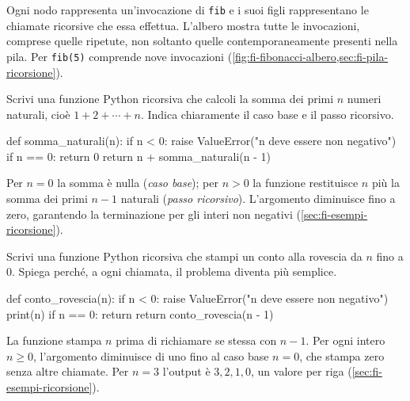 Ogni nodo rappresenta un'invocazione di \texttt{fib} e i suoi
figli rappresentano le chiamate ricorsive che essa effettua.
L'albero mostra tutte le invocazioni, comprese quelle ripetute,
non soltanto quelle contemporaneamente presenti nella pila.
Per \texttt{fib(5)} comprende nove invocazioni
(\cref{fig:fi-fibonacci-albero,sec:fi-pila-ricorsione}).

\begin{exercise}
\label{ex:fi-esercizi-ricorsione-somma-naturali}
Scrivi una funzione Python ricorsiva che calcoli la somma dei primi
\(n\) numeri naturali, cioè \(1+2+\cdots+n\). Indica chiaramente
il caso base e il passo ricorsivo.
\end{exercise}

\begin{unipdcode}[language=Python]
def somma_naturali(n):
    if n < 0:
        raise ValueError("n deve essere non negativo")
    if n == 0:
        return 0
    return n + somma_naturali(n - 1)
\end{unipdcode}

Per \(n=0\) la somma è nulla (\emph{caso base}); per \(n>0\)
la funzione restituisce \(n\) più la somma dei primi \(n-1\)
naturali (\emph{passo ricorsivo}). L'argomento diminuisce fino a
zero, garantendo la terminazione per gli interi non negativi
(\cref{sec:fi-esempi-ricorsione}).

\begin{exercise}
\label{ex:fi-esercizi-ricorsione-conto-rovescia}
Scrivi una funzione Python ricorsiva che stampi un conto alla
rovescia da \(n\) fino a \(0\). Spiega perché, a ogni chiamata,
il problema diventa più semplice.
\end{exercise}

\begin{unipdcode}[language=Python]
def conto_rovescia(n):
    if n < 0:
        raise ValueError("n deve essere non negativo")
    print(n)
    if n == 0:
        return
    return conto_rovescia(n - 1)
\end{unipdcode}

La funzione stampa \(n\) prima di richiamare se stessa con
\(n-1\). Per ogni intero \(n\ge0\), l'argomento diminuisce di
uno fino al caso base \(n=0\), che stampa zero senza altre chiamate.
Per \(n=3\) l'output è \(3,2,1,0\), un valore per riga
(\cref{sec:fi-esempi-ricorsione}).
